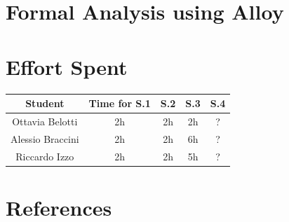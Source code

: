 \documentclass[table, 12pt]{article}
\begin{document}
\section{Formal Analysis using Alloy}
\section{Effort Spent}
    \begin{tabular}{| c || c | c| c| c |}
        \hline
        Student & Time for S.1 & S.2 & S.3 & S.4 \\ \hline
        Ottavia Belotti & 2h & 2h & 2h & ? \\
        Alessio Braccini & 2h & 2h & 6h & ? \\
        Riccardo Izzo & 2h & 2h & 5h & ? \\
        \hline
    \end{tabular}

\section{References}
\end{document}
